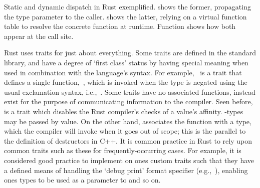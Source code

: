 \begin{listing}[ht]
	\centering
	\inputminted{rust}{dispatch.rs}
	\caption[Static vs dynamic dispatch in Rust.]{Static and dynamic dispatch in Rust exemplified.  shows the former, propagating the type parameter to the caller.  shows the latter, relying on a virtual function table to resolve the concrete function at runtime. Function  shows how both appear at the call site.}
	\label{listing:dispatch}
\end{listing}


Rust uses traits for just about everything. Some traits are defined in the standard library, and have a degree of `first class' status by having special meaning when used in combination with the language's syntax. For example,~ is a trait that defines a single function,~, which is invoked when the type is negated using the usual exclamation syntax, i.e.,\ . Some traits have no associated functions, instead exist for the purpose of communicating information to the compiler. Seen before,~ is a trait which disables the Rust compiler's checks of a value's affinity. -types may be passed by value. On the other hand,  associates the  function with a type, which the compiler will invoke when it goes out of scope; this is the parallel to the definition of destructors in C++. It is common practice in Rust to rely upon common traits such as these for frequently-occurring cases. For example, it is considered good practice to implement  on ones custom traits such that they have a defined means of handling the `debug print' format specifier (e.g.,\ ), enabling ones types to be used as a parameter to  and so on.

